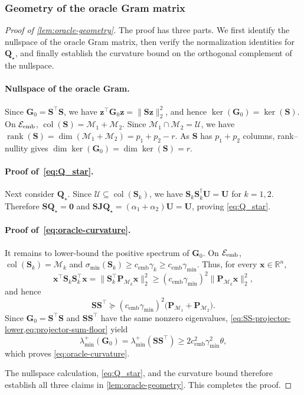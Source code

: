 \documentclass[11pt]{article}
\newcommand{\R}{\mathbb{R}}
\newcommand{\trans}{\top}
\DeclareMathOperator{\col}{col}
\DeclareMathOperator{\rank}{rank}
\newcommand{\lmin}{\lambda^{+}_{\min}}
\newcommand{\cU}{\mathcal{U}}
\newcommand{\cM}{\mathcal{M}}
\newcommand{\cE}{\mathcal{E}}
\newcommand{\gmin}{\gamma_{\min}}
\newcommand{\cemb}{c_{\mathrm{emb}}}
\begin{document}
\subsubsection{Geometry of the oracle Gram matrix}
\label{app:oracle-geometry}


\begin{proof}[Proof of \cref{lem:oracle-geometry}]

The proof has three parts. We first identify the nullspace of the oracle Gram
matrix, then verify the normalization identities for $\bm Q_\star$, and
finally establish the curvature bound on the orthogonal complement of the
nullspace.

\paragraph{Nullspace of the oracle Gram.}
Since $\bm G_0=\bm S^\trans\bm S$, we have
$\bm z^\trans\bm G_0\bm z=\|\bm S\bm z\|_2^2$, and hence
$\ker(\bm G_0)=\ker(\bm S)$.
On $\cE_{\rm emb}$, $\col(\bm S)=\cM_1+\cM_2$. Since
$\cM_1\cap\cM_2=\cU$, we have
$\rank(\bm S)=\dim(\cM_1+\cM_2)=p_1+p_2-r$.
As $\bm S$ has $p_1+p_2$ columns, rank--nullity gives
$\dim\ker(\bm G_0)=\dim\ker(\bm S)=r$.


\paragraph{Proof of~\cref{eq:Q_star}.}
Next consider $\bm Q_\star$.  Since
$\cU\subseteq\col(\bm S_k)$, we have
$\bm S_k\bm S_k^\dagger\bm U=\bm U$ for $k=1,2$.  Therefore
$\bm S\bm Q_\star=\bm 0$ and
$\bm S\bm J\bm Q_\star=(\alpha_1+\alpha_2)\bm U=\bm U$, proving
\cref{eq:Q_star}.  


\paragraph{Proof of~\cref{eq:oracle-curvature}.}
It remains to lower-bound the positive spectrum of $\bm G_0$.
On $\cE_{\rm emb}$,
$\col(\bm S_k)=\cM_k$ and
$\sigma_{\min}(\bm S_k)\ge\cemb\gamma_k\ge\cemb\gmin$.
Thus, for every $\bm x\in\R^n$,
\[
  \bm x^\trans\bm S_k\bm S_k^\trans\bm x
  =
  \|\bm S_k^\trans\bm P_{\cM_k}\bm x\|_2^2
  \ge
  (\cemb\gmin)^2
  \|\bm P_{\cM_k}\bm x\|_2^2,
\]
and hence
\begin{equation}
\label{eq:SS-projector-lower}
  \bm S\bm S^\trans
  \succeq
  (\cemb\gmin)^2
  \bigl(
    \bm P_{\cM_1}+\bm P_{\cM_2}
  \bigr).
\end{equation}
Since $\bm G_0=\bm S^\trans\bm S$ and
$\bm S\bm S^\trans$ have the same nonzero eigenvalues,
\cref{eq:SS-projector-lower,eq:projector-sum-floor} yield
\[
  \lmin(\bm G_0)
  =
  \lmin(\bm S\bm S^\trans)
  \ge
  2\cemb^2\gmin^2\theta,
\]
which proves \cref{eq:oracle-curvature}.

The nullspace calculation, \cref{eq:Q_star}, and the curvature bound therefore
establish all three claims in \cref{lem:oracle-geometry}. This completes the
proof.
\end{proof}
\end{document}
